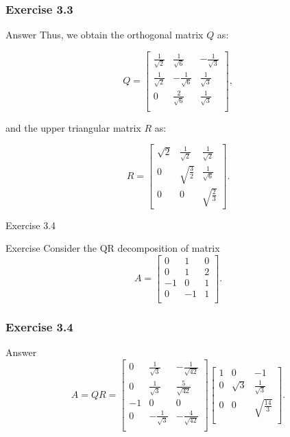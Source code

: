 \documentclass[aspectratio=169, UTF8]{ctexbeamer}
\begin{document}
\begin{frame}
    \frametitle{Exercise 3.3}
    \begin{block}{Answer}
        Thus, we obtain the orthogonal matrix \( Q \) as:

\[
Q = \begin{bmatrix}
\frac{1}{\sqrt{2}} & \frac{1}{\sqrt{6}} & -\frac{1}{\sqrt{3}} \\
\frac{1}{\sqrt{2}} & -\frac{1}{\sqrt{6}} & \frac{1}{\sqrt{3}} \\
0 & \frac{2}{\sqrt{6}} & \frac{1}{\sqrt{3}} \\
\end{bmatrix},
\]

and the upper triangular matrix \( R \) as:

\[
R = \begin{bmatrix}
\sqrt{2} & \frac{1}{\sqrt{2}} & \frac{1}{\sqrt{2}} \\
0 & \sqrt{\frac{3}{2}} & \frac{1}{\sqrt{6}} \\
0 & 0 & \sqrt{\frac{2}{3}}
\end{bmatrix}.
\]
    \end{block}
\end{frame}

\begin{frame}{Exercise 3.4}
    \begin{block}{Exercise}
        Consider the QR decomposition of matrix
\[
A = \begin{bmatrix}
0 & 1 & 0 \\
0 & 1 & 2 \\
-1 & 0 & 1 \\
0 & -1 & 1 \\
\end{bmatrix}.
\]
    \end{block}
\end{frame}

\begin{frame}
    \frametitle{Exercise 3.4}
    \begin{block}{Answer}
        $$A=QR= \begin{bmatrix}
0 & \frac{1}{\sqrt{3}} & -\frac{1}{\sqrt{42}} \\
0 & \frac{1}{\sqrt{3}} & \frac{5}{\sqrt{42}} \\
-1 & 0 & 0 \\
0 & -\frac{1}{\sqrt{3}} & -\frac{4}{\sqrt{42}} \\
\end{bmatrix}
\begin{bmatrix}
1 & 0 & -1 \\
0 & \sqrt{3} & \frac{1}{\sqrt{3}} \\
0 & 0 & \sqrt{\frac{14}{3}} \\
\end{bmatrix}
.
$$
    \end{block}
    
\end{frame}
\end{document}
